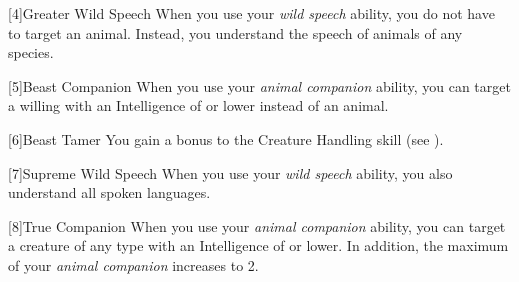         [4]{Greater Wild Speech} When you use your \textit{wild speech} ability, you do not have to target an animal.
        Instead, you understand the speech of animals of any species.

        [5]{Beast Companion} When you use your \textit{animal companion} ability,
        you can target a willing  with an Intelligence of  or lower instead of an animal.

        [6]{Beast Tamer} You gain a  bonus to the Creature Handling skill (see ).

        [7]{Supreme Wild Speech} When you use your \textit{wild speech} ability, you also understand all spoken languages.

        [8]{True Companion} When you use your \textit{animal companion} ability,
        you can target a creature of any type with an Intelligence of  or lower.
        In addition, the maximum  of your \textit{animal companion} increases to 2.

